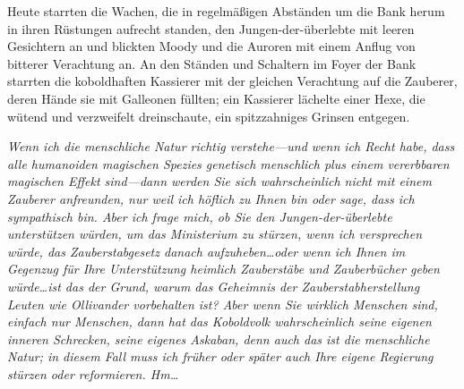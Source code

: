 Heute starrten die Wachen, die in regelmäßigen Abständen um die Bank herum in ihren Rüstungen aufrecht standen, den Jungen-der-überlebte mit leeren Gesichtern an und blickten Moody und die Auroren mit einem Anflug von bitterer Verachtung an. An den Ständen und Schaltern im Foyer der Bank starrten die koboldhaften Kassierer mit der gleichen Verachtung auf die Zauberer, deren Hände sie mit Galleonen füllten; ein Kassierer lächelte einer Hexe, die wütend und verzweifelt dreinschaute, ein spitzzahniges Grinsen entgegen.

\emph{Wenn ich die menschliche Natur richtig verstehe—und wenn ich Recht habe, dass alle humanoiden magischen Spezies genetisch menschlich plus einem vererbbaren magischen Effekt sind—dann werden Sie sich wahrscheinlich nicht mit einem Zauberer anfreunden, nur weil ich höflich zu Ihnen bin oder sage, dass ich sympathisch bin. Aber ich frage mich, ob Sie den Jungen-der-überlebte unterstützen würden, um das Ministerium zu stürzen, wenn ich versprechen würde, das Zauberstabgesetz danach aufzuheben…oder wenn ich Ihnen im Gegenzug für Ihre Unterstützung heimlich Zauberstäbe und Zauberbücher geben würde…ist das der Grund, warum das Geheimnis der Zauberstabherstellung Leuten wie Ollivander vorbehalten ist? Aber wenn Sie wirklich Menschen sind, einfach nur Menschen, dann hat das Koboldvolk wahrscheinlich seine eigenen inneren Schrecken, seine eigenes Askaban, denn auch das ist die menschliche Natur; in diesem Fall muss ich früher oder später auch Ihre eigene Regierung stürzen oder reformieren. Hm…}

